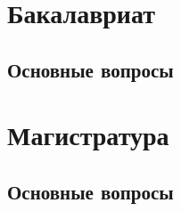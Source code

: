 \documentclass[a4paper,russian]{article}
\begin{document}
\setlength{\parindent}{0in}

\section{Бакалавриат}
\subsection{Основные вопросы}


\section{Магистратура}
\subsection{Основные вопросы}

\end{document}

